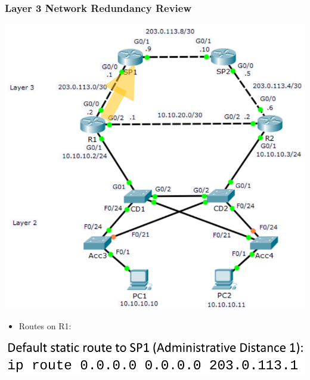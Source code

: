 \documentclass[pdflatex,compress,mathserif]{beamer}
\begin{document}
\begin{frame}
	\frametitle{Layer 3 Network Redundancy Review}
	\begin{multicols}{2}
		\begin{center}
			\includegraphics[width=\linewidth]{img/img02}
		\end{center}
		\columnbreak
		\begin{itemize}
			\item Routes on R1:
		\end{itemize}
		\begin{center}
			\includegraphics[width=\linewidth]{img/img03}
		\end{center}
	\end{multicols}
\end{frame}
\end{document}
